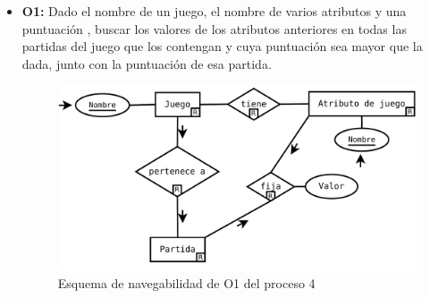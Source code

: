 \begin{itemize}
	\item \textbf{O1:} Dado el nombre de un juego, el nombre de varios atributos y una puntuación
		, buscar los valores de los atributos anteriores en todas las partidas del juego
		que los contengan y cuya puntuación sea mayor que la dada, junto con la puntuación
		de esa partida.\\

	\begin{figure}[H]
		\centering
		\includegraphics[width=0.5\linewidth]{../Diagramas/pdf/Op4-1.pdf}
		\caption{Esquema de navegabilidad de O1 del proceso 4}
	\end{figure}
\end{itemize}

